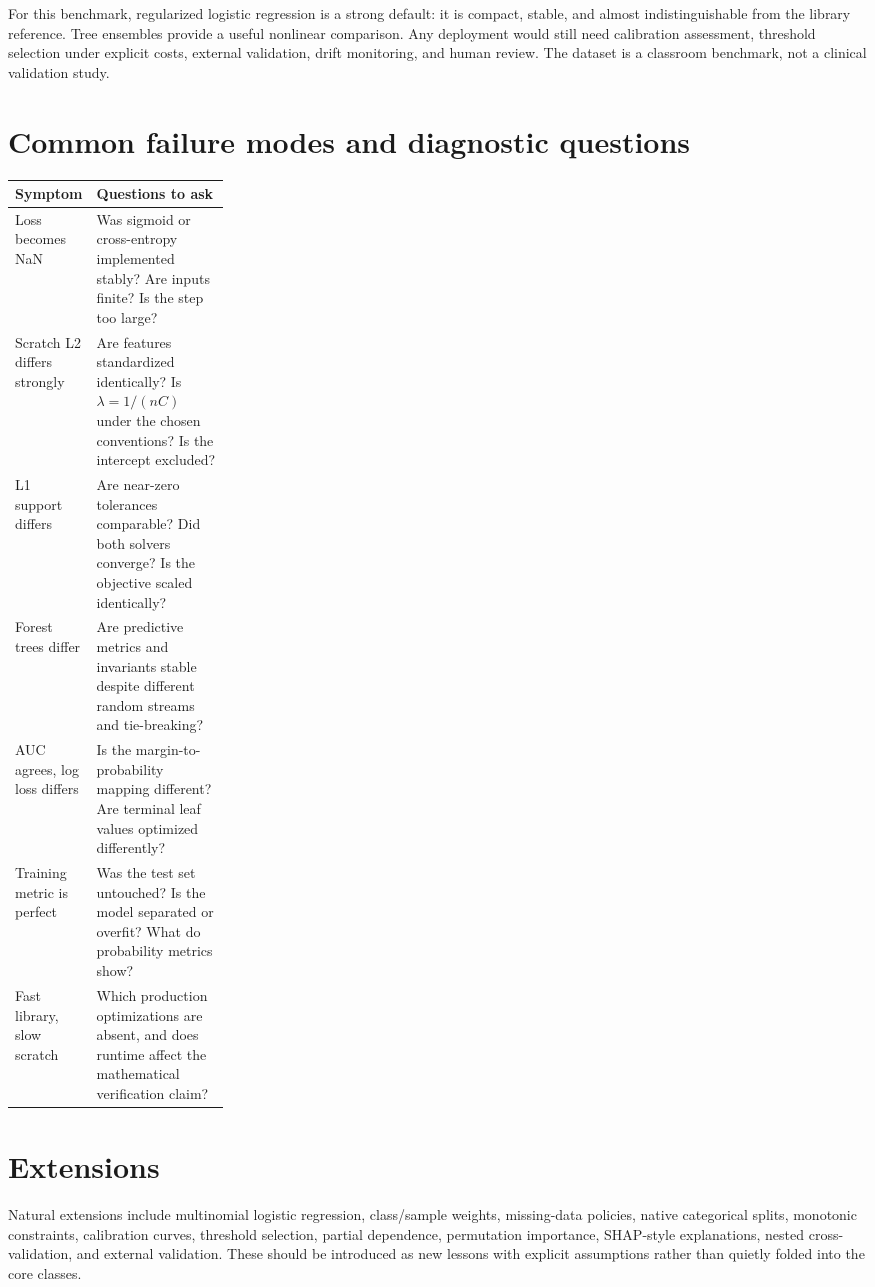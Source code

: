 \documentclass[11pt]{article}
\begin{document}
For this benchmark, regularized logistic regression is a strong default: it is
compact, stable, and almost indistinguishable from the library reference. Tree
ensembles provide a useful nonlinear comparison. Any deployment would still
need calibration assessment, threshold selection under explicit costs, external
validation, drift monitoring, and human review. The dataset is a classroom
benchmark, not a clinical validation study.

\section{Common failure modes and diagnostic questions}

\begin{tabularx}{\linewidth}{p{0.25\linewidth}X}
\toprule
Symptom & Questions to ask \\
\midrule
Loss becomes NaN & Was sigmoid or cross-entropy implemented stably? Are inputs finite? Is the step too large? \\
Scratch L2 differs strongly & Are features standardized identically? Is $\lambda=1/(nC)$ under the chosen conventions? Is the intercept excluded? \\
L1 support differs & Are near-zero tolerances comparable? Did both solvers converge? Is the objective scaled identically? \\
Forest trees differ & Are predictive metrics and invariants stable despite different random streams and tie-breaking? \\
AUC agrees, log loss differs & Is the margin-to-probability mapping different? Are terminal leaf values optimized differently? \\
Training metric is perfect & Was the test set untouched? Is the model separated or overfit? What do probability metrics show? \\
Fast library, slow scratch & Which production optimizations are absent, and does runtime affect the mathematical verification claim? \\
\bottomrule
\end{tabularx}

\section{Extensions}

Natural extensions include multinomial logistic regression, class/sample
weights, missing-data policies, native categorical splits, monotonic
constraints, calibration curves, threshold selection, partial dependence,
permutation importance, SHAP-style explanations, nested cross-validation, and
external validation. These should be introduced as new lessons with explicit
assumptions rather than quietly folded into the core classes.
\end{document}
